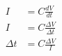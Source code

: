 \documentclass[12pt]{article}
\begin{document}
\begin{align*}
I &= C\frac{dV}{dt}\\
I &= C\frac{\Delta V}{\Delta t}\\
\Delta t &= C\frac{\Delta V}{I}
\end{align*}
\end{document}
